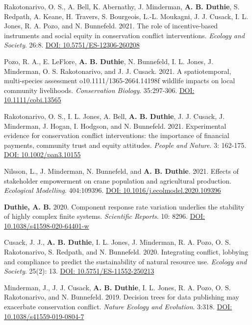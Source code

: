 \documentclass[letterpaper]{article}
\begin{document}
\begin{etaremune}
\item Rakotonarivo, O. S., A. Bell, K. Abernathy, J. Minderman, {\bf A. B. Duthie}, S. Redpath, A. Keane, H. Travers, S. Bourgeois, L.-L. Moukagni, J. J. Cusack, I. L. Jones, R. A. Pozo, and N. Bunnefeld. 2021. The role of incentive-based instruments and social equity in conservation conflict interventions. {\it Ecology and Society}. 26:8. \href{https://www.ecologyandsociety.org/vol26/iss2/art8/}{DOI: 10.5751/ES-12306-260208}
\item Pozo, R. A., E. LeFlore, {\bf A. B. Duthie}, N. Bunnefeld, I. L. Jones, J. Minderman, O. S. Rakotonarivo, and J. J. Cusack. 2021. A spatiotemporal, multi-species assessment o10.1111/1365-2664.14198f wildlife impacts on local community livelihoods. {\it Conservation Biology}. 35:297-306. \href{https://doi.org/10.1111/cobi.13565} {DOI: 10.1111/cobi.13565}
\item Rakotonarivo, O. S., I. L. Jones, A. Bell, {\bf A. B. Duthie}, J. J. Cusack, J. Minderman, J. Hogan, I. Hodgson, and N. Bunnefeld. 2021. Experimental evidence for conservation conflict interventions: the importance of financial payments, community trust and equity attitudes. {\it People and Nature}. 3: 162-175. \href{https://doi.org/10.1002/pan3.10155}{DOI: 10.1002/pan3.10155}
\item Nilsson, L., J. Minderman, N. Bunnefeld, and {\bf A. B. Duthie}. 2021. Effects of stakeholder empowerment on crane population and agricultural production. {\it Ecological Modelling}. 404:109396. \href{https://doi.org/10.1016/j.ecolmodel.2020.109396}{DOI: 10.1016/j.ecolmodel.2020.109396}
\item {\bf Duthie, A. B.} 2020. Component response rate variation underlies the stability of highly complex finite systems. {\it Scientific Reports}. 10: 8296. \href{https://www.nature.com/articles/s41598-020-64401-w}{DOI: 10.1038/s41598-020-64401-w}
\item Cusack, J. J., {\bf A. B. Duthie}, I. L. Jones, J. Minderman, R. A. Pozo, O. S. Rakotonarivo, S. Redpath, and N. Bunnefeld. 2020. Integrating conflict, lobbying and compliance to predict the sustainability of natural resource use. {\it Ecology and Society}. 25(2): 13. \href{https://doi.org/10.5751/ES-11552-250213}{DOI: 10.5751/ES-11552-250213}
\item Minderman, J., J. J. Cusack, {\bf A. B. Duthie}, I. L. Jones, R. A. Pozo, O. S. Rakotonarivo, and N. Bunnefeld. 2019. Decision trees for data publishing may exacerbate conservation conflict. {\it Nature Ecology and Evolution}. 3:318. \href{https://doi.org/10.1038/s41559-019-0804-7}{DOI: 10.1038/s41559-019-0804-7}

\end{etaremune}
\end{document}
